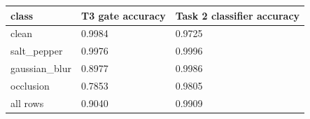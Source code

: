 \begin{tabular}{lll}
\hline
class & T3 gate accuracy & Task 2 classifier accuracy \\
\hline
clean & 0.9984 & 0.9725 \\
salt\_pepper & 0.9976 & 0.9996 \\
gaussian\_blur & 0.8977 & 0.9986 \\
occlusion & 0.7853 & 0.9805 \\
all rows & 0.9040 & 0.9909 \\
\hline
\end{tabular}
